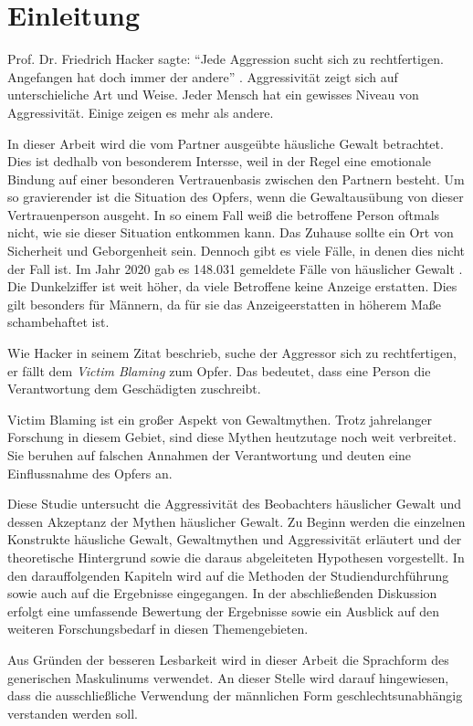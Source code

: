 \chapter{Einleitung}   \label{ch_1}
Prof. Dr. Friedrich Hacker sagte: \enquote{Jede Aggression sucht sich zu rechtfertigen. Angefangen hat doch immer der andere} \parencite{Friedrich_Hacker}. Aggressivität zeigt sich auf unterschieliche Art und Weise. Jeder Mensch hat ein gewisses Niveau von Aggressivität. Einige zeigen es mehr als andere. 


In dieser Arbeit wird die vom Partner ausgeübte häusliche Gewalt betrachtet. Dies ist dedhalb von besonderem Intersse, weil in der Regel eine emotionale Bindung auf einer besonderen Vertrauenbasis zwischen den Partnern besteht. Um so gravierender ist die Situation des Opfers, wenn die Gewaltausübung von dieser Vertrauenperson ausgeht. In so einem Fall weiß die betroffene Person oftmals nicht, wie sie dieser Situation entkommen kann. Das Zuhause sollte ein Ort von Sicherheit und Geborgenheit sein. Dennoch gibt es viele Fälle, in denen dies nicht der Fall ist. Im Jahr 2020 gab es 148.031 gemeldete Fälle von häuslicher Gewalt \parencite{häusliche_Gewalt}. Die Dunkelziffer ist weit höher, da viele Betroffene keine Anzeige erstatten. Dies gilt besonders für Männern, da für sie das Anzeigeerstatten in höherem Maße schambehaftet ist.

Wie Hacker \parencite{Friedrich_Hacker} in seinem Zitat beschrieb, suche der Aggressor sich zu rechtfertigen, er fällt dem \textit{Victim Blaming} zum Opfer. Das bedeutet, dass eine Person die Verantwortung dem Geschädigten zuschreibt. 

Victim Blaming ist ein großer Aspekt von Gewaltmythen. Trotz jahrelanger Forschung in diesem Gebiet, sind diese Mythen heutzutage noch weit verbreitet. 
Sie beruhen auf falschen Annahmen der Verantwortung und deuten eine Einflussnahme des Opfers an.

Diese Studie untersucht die Aggressivität des Beobachters häuslicher Gewalt und dessen Akzeptanz der Mythen häuslicher Gewalt. Zu Beginn werden die einzelnen Konstrukte häusliche Gewalt, Gewaltmythen und Aggressivität erläutert und der theoretische Hintergrund sowie die daraus abgeleiteten Hypothesen vorgestellt. In den darauffolgenden Kapiteln wird auf die Methoden der Studiendurchführung sowie auch auf die Ergebnisse eingegangen. In der 
abschließenden Diskussion erfolgt eine umfassende Bewertung der Ergebnisse sowie ein Ausblick auf den weiteren Forschungsbedarf in diesen Themengebieten.

Aus Gründen der besseren Lesbarkeit wird in dieser Arbeit die Sprachform des generischen Maskulinums verwendet. An dieser Stelle wird darauf hingewiesen, dass die ausschließliche Verwendung der männlichen Form geschlechtsunabhängig verstanden werden soll.